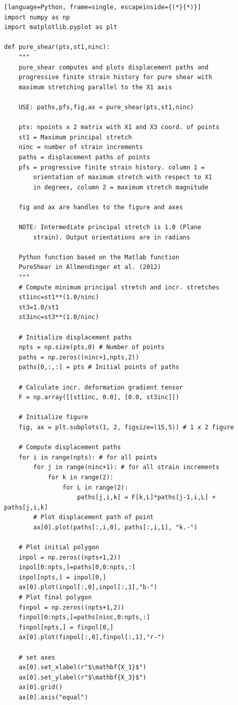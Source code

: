 \documentclass[a4paper , 12pt]{book}
\begin{document}
\begin{center}
\begin{lstlisting}[language=Python, frame=single, escapeinside={(*}{*)}]
import numpy as np
import matplotlib.pyplot as plt

def pure_shear(pts,st1,ninc):
	"""
	pure_shear computes and plots displacement paths and
	progressive finite strain history for pure shear with
	maximum stretching parallel to the X1 axis
	
	USE: paths,pfs,fig,ax = pure_shear(pts,st1,ninc)
	
	pts: npoints x 2 matrix with X1 and X3 coord. of points
	st1 = Maximum principal stretch
	ninc = number of strain increments
	paths = displacement paths of points
	pfs = progressive finite strain history. column 1 =
		orientation of maximum stretch with respect to X1
		in degrees, column 2 = maximum stretch magnitude
		
	fig and ax are handles to the figure and axes
	
	NOTE: Intermediate principal stretch is 1.0 (Plane 
		strain). Output orientations are in radians
		
	Python function based on the Matlab function
	PureShear in Allmendinger et al. (2012)
	"""
	# Compute minimum principal stretch and incr. stretches
	st1inc=st1**(1.0/ninc)
	st3=1.0/st1
	st3inc=st3**(1.0/ninc)
	
	# Initialize displacement paths
	npts = np.size(pts,0) # Number of points
	paths = np.zeros((ninc+1,npts,2))
	paths[0,:,:] = pts # Initial points of paths
	
	# Calculate incr. deformation gradient tensor
	F = np.array([[st1inc, 0.0], [0.0, st3inc]])
	
	# Initialize figure
	fig, ax = plt.subplots(1, 2, figsize=(15,5)) # 1 x 2 figure
	
	# Compute displacement paths
	for i in range(npts): # for all points
		for j in range(ninc+1): # for all strain increments
			for k in range(2):
				for L in range(2):
					paths[j,i,k] = F[k,L]*paths[j-1,i,L] + paths[j,i,k]
		# Plot displacement path of point
		ax[0].plot(paths[:,i,0], paths[:,i,1], "k.-")
	
	# Plot initial polygon
	inpol = np.zeros((npts+1,2))
	inpol[0:npts,]=paths[0,0:npts,:]
	inpol[npts,] = inpol[0,]
	ax[0].plot(inpol[:,0],inpol[:,1],"b-")
	# Plot final polygon
	finpol = np.zeros((npts+1,2))
	finpol[0:npts,]=paths[ninc,0:npts,:]
	finpol[npts,] = finpol[0,]
	ax[0].plot(finpol[:,0],finpol[:,1],"r-")
	
	# set axes
	ax[0].set_xlabel(r"$\mathbf{X_1}$")
	ax[0].set_ylabel(r"$\mathbf{X_3}$")
	ax[0].grid()
	ax[0].axis("equal")
	

\end{lstlisting}
\end{center}
\end{document}
